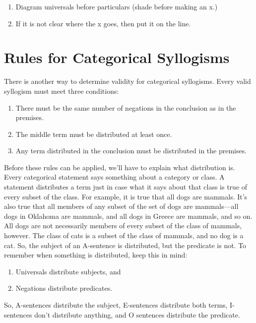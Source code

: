 \documentclass[../logic-text.tex]{subfiles}
\begin{document}
\begin{enumerate}

  

\item Diagram universals before particulars (shade before making an x.)
\item If it is not clear where the x goes, then put it on the line.
\end{enumerate}

\section{Rules for Categorical Syllogisms}

There is another way to determine validity for categorical syllogisms. Every valid syllogism must meet three conditions:


\begin{enumerate}


\item There must be the same number of negations in the conclusion as in the premises.
\item The middle term must be distributed at least once.
\item Any term distributed in the conclusion must be distributed in the premises.
\end{enumerate}

Before these rules can be applied, we'll have to explain what distribution is. Every categorical statement says something about a category or class. A statement distributes a term just in case what it says about that class is true of every subset of the class. For example, it is true that all dogs are mammals. It's also true that all members of any subset of the set of dogs are mammals---all dogs in Oklahoma are mammals, and all dogs in Greece are mammals, and so on. All dogs are not necessarily members of every subset of the class of mammals, however. The class of cats is a subset of the class of mammals, and no dog is a cat. So, the subject of an A-sentence is distributed, but the predicate is not.  To remember when something is distributed, keep this in mind:

\begin{enumerate}
\item Universals distribute subjects, and
\item Negations distribute predicates.
\end{enumerate}

So, A-sentences distribute the subject, E-sentences distribute both terms, I-sentences don't distribute anything, and O sentences distribute the predicate.
\end{document}
